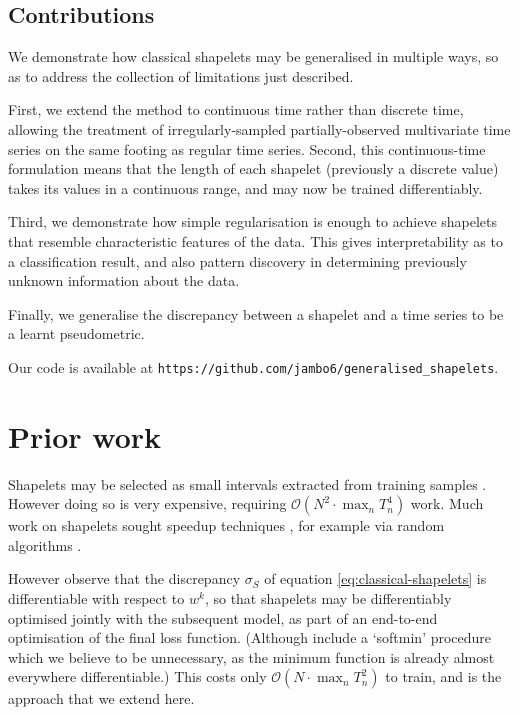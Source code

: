 \documentclass{article}
\theoremstyle{plain}
\theoremstyle{definition}
\newcommand{\bigO}{\mathcal{O}}
\begin{document}
	\subsection{Contributions}
	We demonstrate how classical shapelets may be generalised in multiple ways, so as to address the collection of limitations just described.

	First, we extend the method to continuous time rather than discrete time, allowing the treatment of irregularly-sampled partially-observed multivariate time series on the same footing as regular time series. Second, this continuous-time formulation means that the length of each shapelet (previously a discrete value) takes its values in a continuous range, and may now be trained differentiably.
	
	Third, we demonstrate how simple regularisation is enough to achieve shapelets that resemble characteristic features of the data. This gives interpretability as to a classification result, and also pattern discovery in determining previously unknown information about the data.
	
	Finally, we generalise the discrepancy between a shapelet and a time series to be a learnt pseudometric.%
	
	Our code is available at \texttt{https://github.com/jambo6/generalised\_shapelets}.
	
	\section{Prior work}
	Shapelets may be selected as small intervals extracted from training samples \cite{ye2009firstshapelet}. However doing so is very expensive, requiring $\bigO(N^2 \cdot \max_n T_n^4)$ work. Much work on shapelets sought speedup techniques \cite{mueen2011logical, grabocka2015scalable, grabocka2016speedshapelet}, for example via random algorithms \cite{rak2013fast, wistuba2015ultrafast}.
	
	However \cite{grabocka2014learningshapelet} observe that the discrepancy $\sigma_S$ of equation \eqref{eq:classical-shapelets} is differentiable with respect to $w^{k}$, so that shapelets may be differentiably optimised jointly with the subsequent model, as part of an end-to-end optimisation of the final loss function. (Although \cite{grabocka2014learningshapelet} include a `softmin' procedure which we believe to be unnecessary, as the minimum function is already almost everywhere differentiable.) This costs only $\bigO(N \cdot \max_n T_n^2)$ to train, and is the approach that we extend here.
	
\end{document}
